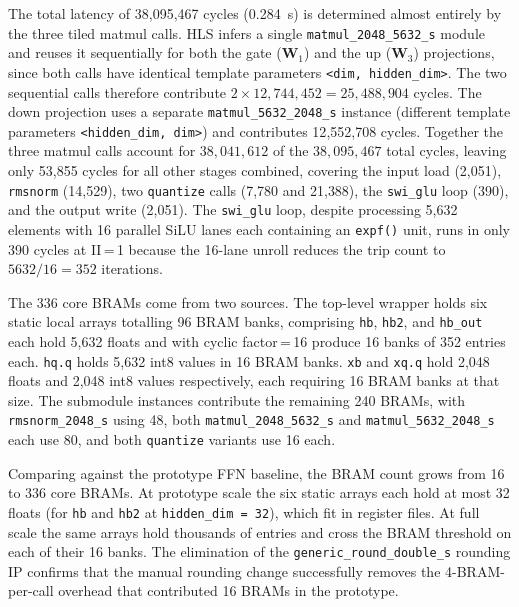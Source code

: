 The total latency of 38{,}095{,}467 cycles (\SI{0.284}{\second}) is
determined almost entirely by the three tiled matmul calls.
HLS infers a single \texttt{matmul\_2048\_5632\_s} module and reuses it
sequentially for both the gate ($\mathbf{W}_1$) and the up ($\mathbf{W}_3$)
projections, since both calls have identical template parameters
\texttt{<dim,\,hidden\_dim>}. The two sequential calls therefore
contribute $2 \times 12{,}744{,}452 = 25{,}488{,}904$ cycles. The down
projection uses a separate \texttt{matmul\_5632\_2048\_s} instance
(different template parameters \texttt{<hidden\_dim,\,dim>}) and
contributes 12{,}552{,}708 cycles. Together the three matmul calls account
for $38{,}041{,}612$ of the $38{,}095{,}467$ total cycles, leaving only
53{,}855 cycles for all other stages combined, covering the input
load (2{,}051), \texttt{rmsnorm} (14{,}529), two \texttt{quantize}
calls (7{,}780 and 21{,}388), the \texttt{swi\_glu} loop (390), and
the output write (2{,}051).
The \texttt{swi\_glu} loop, despite processing 5{,}632 elements with 16
parallel SiLU lanes each containing an \texttt{expf()} unit, runs in
only 390 cycles at II\,=\,1 because the 16-lane unroll reduces the trip
count to $5632/16 = 352$ iterations.

The 336 core BRAMs come from two sources. The top-level wrapper holds
six static local arrays totalling 96 BRAM banks, comprising \texttt{hb},
\texttt{hb2}, and \texttt{hb\_out} each hold 5{,}632 floats and with
cyclic factor\,=\,16 produce 16 banks of 352 entries each. \texttt{hq.q}
holds 5{,}632 int8 values in 16 BRAM banks. \texttt{xb} and \texttt{xq.q}
hold 2{,}048 floats and 2{,}048 int8 values respectively, each requiring
16 BRAM banks at that size. The submodule instances contribute the
remaining 240 BRAMs, with \texttt{rmsnorm\_2048\_s} using 48, both
\texttt{matmul\_2048\_5632\_s} and \texttt{matmul\_5632\_2048\_s} each
use 80, and both \texttt{quantize} variants use 16 each.

Comparing against the prototype FFN baseline, the BRAM count grows from
16 to 336 core BRAMs. At prototype scale the six static arrays each hold
at most 32 floats (for \texttt{hb} and \texttt{hb2} at
\texttt{hidden\_dim\,=\,32}), which fit in register files. At full scale
the same arrays hold thousands of entries and cross the BRAM threshold
on each of their 16 banks. The elimination of the
\texttt{generic\_round\_double\_s} rounding IP confirms that the manual
rounding change successfully removes the 4-BRAM-per-call overhead that
contributed 16 BRAMs in the prototype.

